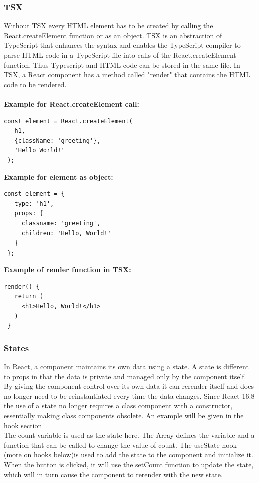 \subsubsection{TSX}
Without TSX every HTML element has to be created by calling the React.createElement function or as an object. TSX is an abstraction of TypeScript that enhances the syntax and enables the TypeScript compiler to parse HTML code in a TypeScript file into calls of the React.createElement function. Thus Typescript and HTML code can be stored in the same file. In TSX, a React component has a method called "render" that contains the HTML code to be rendered.\\\\
\textbf{Example for React.createElement call:}
\begin{Verbatim}[frame=single]
 const element = React.createElement(
   h1,
   {className: 'greeting'},
   'Hello World!'
 );
\end{Verbatim}
\pagebreak
\textbf{Example for element as object:}
\begin{Verbatim}[frame=single]
 const element = {
   type: 'h1',
   props: {
     classname: 'greeting',
     children: 'Hello, World!'
   }
 };
\end{Verbatim}
\textbf{Example of render function in TSX:}
\begin{Verbatim}[frame=single]
 render() {
   return (
     <h1>Hello, World!</h1>
   )    
 }
\end{Verbatim}
\subsubsection{States}
In React, a component maintains its own data using a state. A state is different to props in that the data is private and managed only by the component itself.
By giving the component control over its own data it can rerender itself and does no longer need to be reinstantiated every time the data changes. Since React 16.8 the use of a state no longer requires a class component with a constructor, essentially making class components obsolete. An example will be given in the hook section\\

The count variable is used as the state here. The Array defines the variable and a function that can be called to change the value of count. The useState hook (more on hooks below)is used to add the state to the component and initialize it. When the button is clicked, it will use the setCount function to update the state, which will in turn cause the component to rerender with the new state.
\pagebreak
